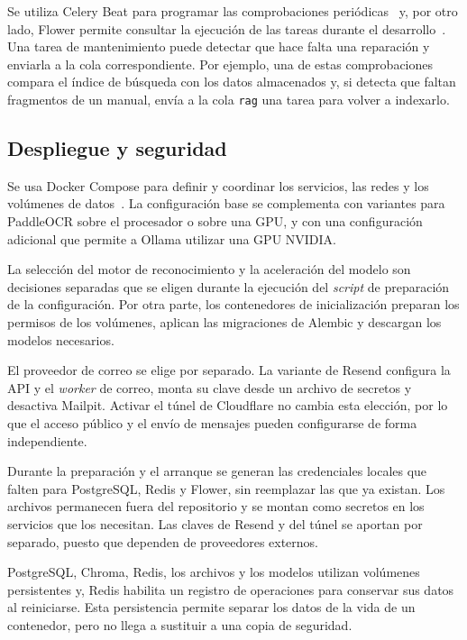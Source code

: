 Se utiliza Celery Beat para programar las comprobaciones
periódicas~\cite{celery_periodic_tasks} y, por otro lado, Flower permite consultar
la ejecución de las tareas durante el desarrollo~\cite{flower}. Una tarea de
mantenimiento puede detectar que hace falta una
reparación y enviarla a la cola correspondiente. Por ejemplo, una de estas
comprobaciones compara el índice de búsqueda con los datos
almacenados y, si detecta que faltan fragmentos de un manual, envía a la
cola \texttt{rag} una tarea para volver a indexarlo.

\FloatBarrier
\subsection{Despliegue y seguridad}
\label{sec:diseno-seguridad}

Se usa Docker Compose para definir y coordinar los servicios, las redes y los volúmenes de datos~\cite{docker_compose}.
La configuración base se complementa con variantes para PaddleOCR sobre el
procesador o sobre una \ac{GPU}, y con una configuración adicional que permite a
Ollama utilizar una \ac{GPU} NVIDIA.

La selección del motor de
reconocimiento y la aceleración del modelo son decisiones separadas que se eligen durante la ejecución del \textit{script} de preparación de la configuración. Por otra parte, los
contenedores de inicialización preparan los permisos de los volúmenes,
aplican las migraciones de Alembic y descargan los modelos necesarios.

El proveedor de correo se elige por separado. La variante de Resend
configura la \ac{API} y el \textit{worker} de correo, monta su clave desde un
archivo de secretos y desactiva Mailpit. Activar el túnel de Cloudflare no
cambia esta elección, por lo que el acceso público y el envío de mensajes
pueden configurarse de forma independiente.

Durante la preparación y el arranque se generan las credenciales locales
que falten para PostgreSQL, Redis y Flower, sin reemplazar las que ya
existan. Los archivos permanecen fuera del repositorio y se montan como
secretos en los servicios que los necesitan. Las claves de Resend y del
túnel se aportan por separado, puesto que dependen de proveedores externos.

PostgreSQL, Chroma, Redis, los archivos y los modelos utilizan volúmenes
persistentes y, Redis habilita un registro de operaciones para conservar sus
datos al reiniciarse. Esta persistencia permite separar los datos de la vida
de un contenedor, pero no llega a sustituir a una copia de seguridad.


